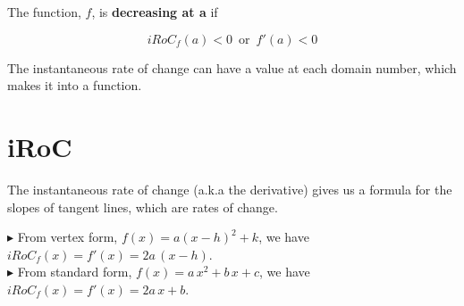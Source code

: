 \documentclass{ximera}
\begin{document}
The function, $f$, is \textbf{\textcolor{purple!85!blue}{decreasing at a}} if


\[
iRoC_f(a) < 0 \, \text{ or } \, f'(a) < 0
\]








The instantaneous rate of change can have a value at each domain number, which makes it into a function.






\section{iRoC}


The instantaneous rate of change (a.k.a the derivative) gives us a formula for the slopes of tangent lines, which are rates of change.



\textbf{\textcolor{red!90!darkgray}{$\blacktriangleright$}} From vertex form, $f(x) = a (x -h)^2 + k$, we have $iRoC_f(x) = f'(x) = 2 a \, (x-h)$. \\



\textbf{\textcolor{red!90!darkgray}{$\blacktriangleright$}} From standard form, $f(x) = a \, x^2 + b \, x + c$, we have $iRoC_f(x) = f'(x) = 2 a \, x + b$. \\
\end{document}
